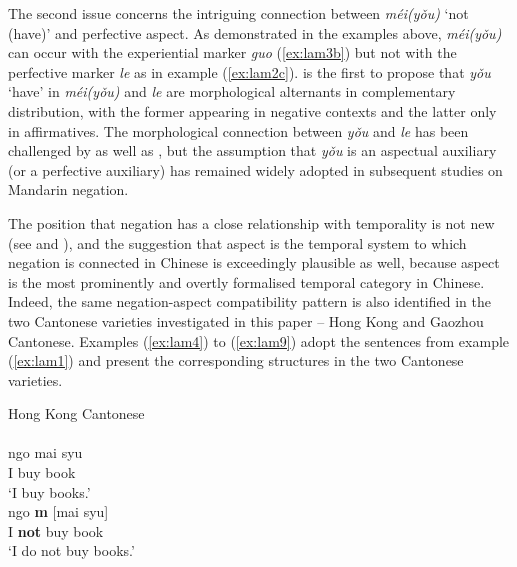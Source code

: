 \documentclass[output=paper]{langscibook}
\begin{document}
The second issue concerns the intriguing connection between \textit{méi(yǒu)} `not (have)' and perfective aspect. As demonstrated in the examples above, \textit{méi(yǒu)} can occur with the experiential marker \textit{guo} (\ref{ex:lam3b}) but not with the perfective marker \textit{le} as in example (\ref{ex:lam2c}). \cite{Wang1965} is the first to propose that \textit{yǒu} `have' in \textit{méi(yǒu)} and \textit{le} are morphological alternants in complementary distribution, with the former appearing in negative contexts and the latter only in affirmatives. The morphological connection between \textit{yǒu} and \textit{le} has been challenged by \citet[434--438]{LiThompson1981} as well as \cite{Li2007}, but the assumption that \textit{yǒu} is an aspectual auxiliary (or a perfective auxiliary) has remained widely adopted in subsequent studies on Mandarin negation.

The position that negation has a close relationship with temporality is not new (see \citealt{Zanuttini2001} and \citealt{Miestamo2005}), and the suggestion that aspect is the temporal system to which negation is connected in Chinese is exceedingly plausible as well, because aspect is the most prominently and overtly formalised temporal category in Chinese. Indeed, the same negation-aspect compatibility pattern is also identified in the two Cantonese varieties investigated in this paper – Hong Kong and Gaozhou Cantonese. Examples (\ref{ex:lam4}) to (\ref{ex:lam9}) adopt the sentences from example (\ref{ex:lam1}) and present the corresponding structures in the two Cantonese varieties.

\ea Hong Kong Cantonese \label{ex:lam4}\\
   \label{ex:lam4a}\\
    \gll ngo	mai	syu\\
	I buy book\\
	\glt `I buy books.'
   \label{ex:lam4b}\\
    \gll ngo	 \textbf{m} [mai syu]\\ 
	I \textbf{not} buy book\\
	\glt `I do not buy books.'
\z \z
\end{document}
